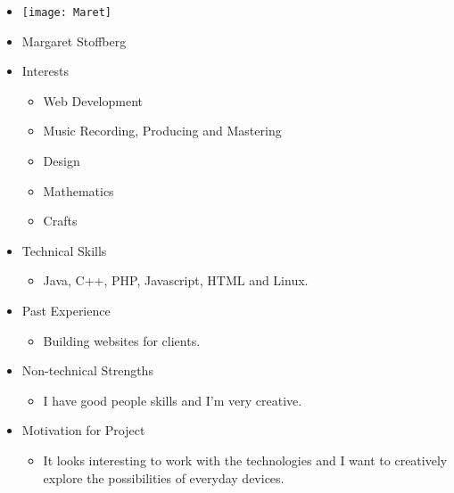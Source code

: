 
\begin{itemize}
	\item[] \texttt{[image: Maret]}
	\item[] Margaret Stoffberg
	\item Interests
	\begin{itemize}
		\item Web Development
		\item Music Recording, Producing and Mastering
		\item Design
		\item Mathematics
		\item Crafts
	\end{itemize}
	\item Technical Skills
	\begin{itemize}
		\item[] Java, C++, PHP, Javascript, HTML and Linux.
	\end{itemize}
	\item Past Experience
	\begin{itemize}
		\item[] Building websites for clients.
	\end{itemize}
	\item Non-technical Strengths
	\begin{itemize}
		\item[] I have good people skills and I'm very creative.
	\end{itemize}
	\item Motivation for Project
	\begin{itemize}
		\item[] It looks interesting to work with the technologies and I want to creatively explore the possibilities of everyday devices.
	\end{itemize}
\end{itemize}
